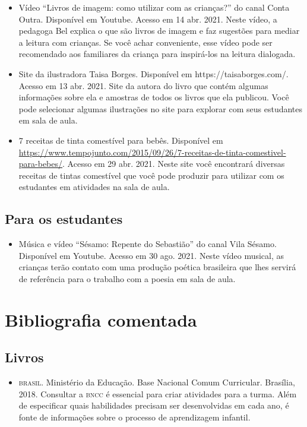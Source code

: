 \documentclass[11pt]{extarticle}
\begin{document}
\begin{enumerate}
\begin{itemize}
\item Vídeo “Livros de imagem: como utilizar com as crianças?” do canal Conta Outra. Disponível em Youtube. 
Acesso em 14 abr. 2021. 
Neste vídeo, a pedagoga Bel explica o que são livros de imagem e faz sugestões para mediar a leitura com 
crianças. Se você achar conveniente, esse vídeo pode ser recomendado aos familiares da criança 
para inspirá-los na leitura dialogada. 

\item Site da ilustradora Taisa Borges. Disponível em https://taisaborges.com/. Acesso em 13 abr. 2021. 
Site da autora do livro que contém algumas informações sobre ela e amostras de todos os livros que ela publicou. 
Você pode selecionar algumas ilustrações no site para explorar com seus estudantes em sala de aula. 

\item 7 receitas de tinta comestível para bebês. 
Disponível em \url{https://www.tempojunto.com/2015/09/26/7-receitas-de-tinta-comestivel-para-bebes/}. 
Acesso em 29 abr. 2021. 
Neste site você encontrará diversas receitas de tintas comestível que você pode produzir 
para utilizar com os estudantes em atividades na sala de aula. 
\end{itemize}

\subsection{Para os estudantes}
\begin{itemize}
\item Música e vídeo ``Sésamo: Repente do Sebastião'' do canal Vila Sésamo. Disponível em Youtube.
Acesso em 30 ago. 2021. 
Neste vídeo musical, as crianças terão contato com uma produção poética brasileira
que lhes servirá de referência para o trabalho com a poesia em sala de aula. 


\end{itemize}


\section{Bibliografia comentada}

\subsection{Livros}

\begin{itemize}
\item \textsc{brasil}. Ministério da Educação. Base Nacional Comum Curricular. Brasília, 2018.
Consultar a \textsc{bncc} é essencial para criar atividades para a turma. Além de especificar 
quais habilidades precisam ser desenvolvidas em cada ano, é fonte de informações sobre 
o processo de aprendizagem infantil. 


\end{itemize}
\end{enumerate}
\end{document}
